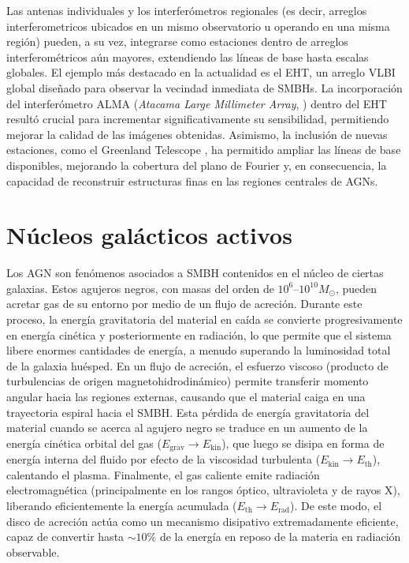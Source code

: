 	Las antenas individuales y los interferómetros regionales (es decir, arreglos interferometricos ubicados en un mismo observatorio u operando en una misma regi\'on) pueden, a su vez, integrarse como estaciones dentro de arreglos interferométricos aún mayores, extendiendo las líneas de base hasta escalas globales. 
	El ejemplo más destacado en la actualidad es el EHT, un arreglo VLBI global diseñado para observar la vecindad inmediata de SMBHs. La incorporación del interferómetro ALMA (\textit{Atacama Large Millimeter Array}, \citealt{Wootten2009}) dentro del EHT resultó crucial para incrementar significativamente su sensibilidad, permitiendo mejorar la calidad de las imágenes obtenidas. 
	Asimismo, la inclusión de nuevas estaciones, como el Greenland Telescope \citep{Chen2023GLT}, ha permitido ampliar las líneas de base disponibles, mejorando la cobertura del plano de Fourier y, en consecuencia, la capacidad de reconstruir estructuras finas en las regiones centrales de AGNs.
	

	




\section{Núcleos galácticos activos}\label{sec:AGNs}

	Los AGN son fenómenos asociados a SMBH contenidos en el núcleo de ciertas galaxias.
	Estos agujeros negros, con masas del orden de $10^6$–$10^{10}  M_\odot$, pueden acretar gas de su entorno por medio de un flujo de acreción.
	Durante este proceso, la energía gravitatoria del material en caída se convierte progresivamente en energía cinética y posteriormente en radiación, lo que permite que el sistema libere enormes cantidades de energía, a menudo superando la luminosidad total de la galaxia huésped. 
	En un flujo de acreción, el esfuerzo viscoso (producto de turbulencias de origen magnetohidrodinámico) permite transferir momento angular hacia las regiones externas, causando que el material caiga en una trayectoria espiral hacia el SMBH.
	Esta pérdida de energía gravitatoria del material cuando se acerca al agujero negro se traduce en un aumento de la energía cinética orbital del gas ($E_\mathrm{grav} \to E_\mathrm{kin}$), que luego se disipa en forma de energía interna del fluido por efecto de la viscosidad turbulenta ($E_\mathrm{kin} \to E_\mathrm{th}$), calentando el plasma.
	Finalmente, el gas caliente emite radiación electromagnética (principalmente en los rangos óptico, ultravioleta y de rayos X), liberando eficientemente la energía acumulada ($E_\mathrm{th} \to E_\mathrm{rad}$). 
	De este modo, el disco de acreción actúa como un mecanismo disipativo extremadamente eficiente, capaz de convertir hasta $\sim 10\%$ de la energía en reposo de la materia en radiación observable.


